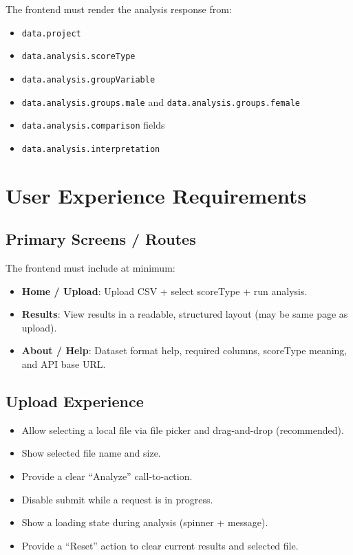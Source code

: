 \documentclass[12pt,a4paper]{article}
\begin{document}
The frontend must render the analysis response from:
\begin{itemize}
    \item \texttt{data.project}
    \item \texttt{data.analysis.scoreType}
    \item \texttt{data.analysis.groupVariable}
    \item \texttt{data.analysis.groups.male} and \texttt{data.analysis.groups.female}
    \item \texttt{data.analysis.comparison} fields
    \item \texttt{data.analysis.interpretation}
\end{itemize}

\section{User Experience Requirements}

\subsection{Primary Screens / Routes}

The frontend must include at minimum:
\begin{itemize}
    \item \textbf{Home / Upload}: Upload CSV + select scoreType + run analysis.
    \item \textbf{Results}: View results in a readable, structured layout (may be same page as upload).
    \item \textbf{About / Help}: Dataset format help, required columns, scoreType meaning, and API base URL.
\end{itemize}

\subsection{Upload Experience}

\begin{itemize}
    \item Allow selecting a local file via file picker and drag-and-drop (recommended).
    \item Show selected file name and size.
    \item Provide a clear ``Analyze'' call-to-action.
    \item Disable submit while a request is in progress.
    \item Show a loading state during analysis (spinner + message).
    \item Provide a ``Reset'' action to clear current results and selected file.
\end{itemize}
\end{document}
